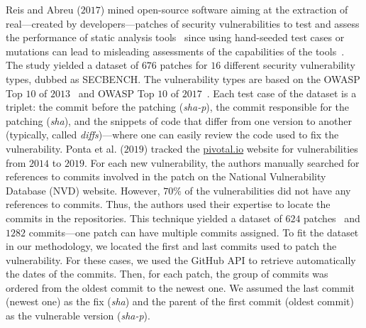 \documentclass[smallextended]{svjour3}       %
\begin{document}
Reis and Abreu 
($2017$) mined open-source software aiming at the extraction of 
real---created by developers---patches of security vulnerabilities 
to test and assess the performance of static analysis 
tools~\cite{reis2017secbench,Reis:2017:IJSSE} since using hand-seeded test cases or 
mutations can lead to misleading assessments of the capabilities of 
the tools~\cite{just2014mutants}. The study yielded a dataset of 
$676$ patches for $16$ different security vulnerability types, dubbed as SECBENCH. 
The vulnerability types are based on the OWASP Top $10$ of 
$2013$~\cite{oswap:2013} and OWASP Top $10$ of 
$2017$~\cite{oswap:2017}. Each test case of the dataset is a 
triplet: the commit before the patching (\emph{sha-p}), the commit responsible
for the patching (\emph{sha}), and the snippets of code that differ from one 
version to another (typically, called \emph{diffs})---where one 
can easily review the code used to fix the vulnerability. 
%
Ponta et al. ($2019$) tracked the \url{pivotal.io} website for 
vulnerabilities from $2014$ to $2019$. For each new vulnerability, 
the authors manually searched for references to commits involved in 
the patch on the National Vulnerability Database (NVD) website. 
However, $70\%$ of the vulnerabilities did not have any references 
to commits. Thus, the authors used their expertise to locate the 
commits in the repositories. This technique yielded a dataset of 
$624$ patches~\cite{10.1109/MSR.2019.00064} and $1282$ commits---one 
patch can have multiple commits assigned. To fit the dataset in our methodology, we located the 
first and last commits used to patch the vulnerability. For these 
cases, we used the GitHub API to retrieve automatically the dates of 
the commits. Then, for each patch, the group of commits was ordered 
from the oldest commit to the newest one. We assumed the last commit 
(newest one) as the fix (\emph{sha}) and the parent of the 
first commit (oldest commit) as the vulnerable version 
(\emph{sha-p}). 
%
\end{document}
